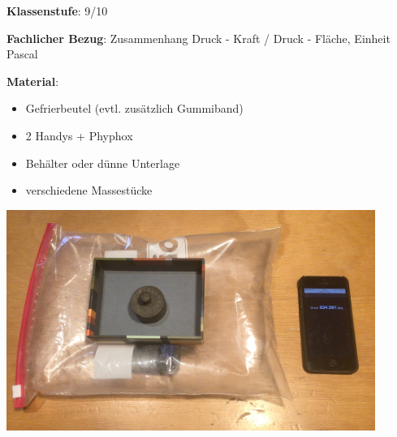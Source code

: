 \documentclass[../main.tex]{subfiles}
\begin{document}
\begin{tcolorbox}[
    width=\textwidth,
    height=\textheight,
    title=Phyphox: Kraft und Spannung,
    fonttitle=\Large,
    before title=\vspace{0.2cm}, after title=\vspace{0.2cm},
    colback=white,
    title filled=true, 
    colbacktitle=myorange,
    colframe=black,
    coltitle=black,
    ]

    \vspace{0.2cm}
    \textbf{Klassenstufe}: 9/10

    \vspace{0.5cm}

    \textbf{Fachlicher Bezug}: Zusammenhang Druck - Kraft / Druck - Fläche, Einheit Pascal

    \vspace{0.2cm}
    \begin{minipage}[]{0.5\textwidth}


        \textbf{Material}: 
        \begin{itemize}[noitemsep]
            \item Gefrierbeutel (evtl. zusätzlich Gummiband)
            \item 2 Handys + Phyphox 
            \item Behälter oder dünne Unterlage 
            \item verschiedene Massestücke 
        \end{itemize}


    \end{minipage}
    \hspace{1.2cm}
    \begin{minipage}[]{0.45\textwidth}
        \vspace{0.2cm}
        \includegraphics[width=0.9\textwidth]{img/versuchsaufbau}
    \end{minipage}


\end{tcolorbox}
\end{document}
